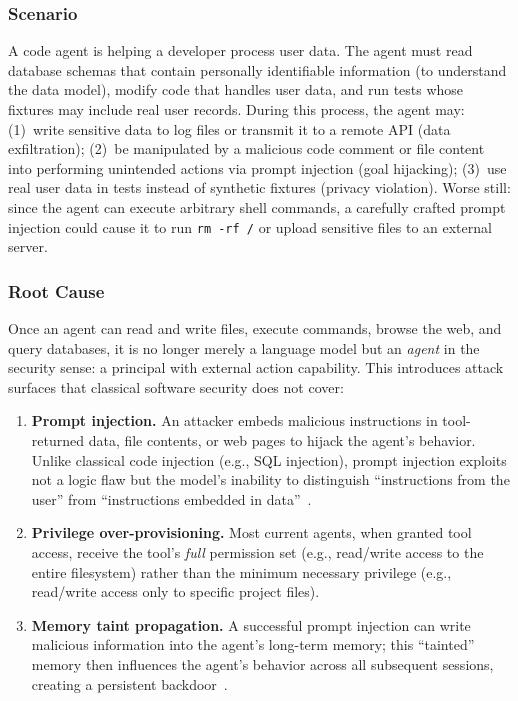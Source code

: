 \subsubsection{Scenario}
A code agent is helping a developer process user data.
The agent must read database schemas that contain personally identifiable information (to understand the data model), modify code that handles user data, and run tests whose fixtures may include real user records.
During this process, the agent may: (1)~write sensitive data to log files or transmit it to a remote API (data exfiltration); (2)~be manipulated by a malicious code comment or file content into performing unintended actions via prompt injection (goal hijacking); (3)~use real user data in tests instead of synthetic fixtures (privacy violation).
Worse still: since the agent can execute arbitrary shell commands, a carefully crafted prompt injection could cause it to run \texttt{rm -rf /} or upload sensitive files to an external server.

\subsubsection{Root Cause}
Once an agent can read and write files, execute commands, browse the web, and query databases, it is no longer merely a language model but an \emph{agent} in the security sense: a principal with external action capability.
This introduces attack surfaces that classical software security does not cover:

\begin{enumerate}[nosep]
\item \textbf{Prompt injection.}
An attacker embeds malicious instructions in tool-returned data, file contents, or web pages to hijack the agent's behavior.
Unlike classical code injection (e.g., SQL injection), prompt injection exploits not a logic flaw but the model's inability to distinguish ``instructions from the user'' from ``instructions embedded in data''~\cite{debenedetti2025camel,owasp_agentic2026}.

\item \textbf{Privilege over-provisioning.}
Most current agents, when granted tool access, receive the tool's \emph{full} permission set (e.g., read/write access to the entire filesystem) rather than the minimum necessary privilege (e.g., read/write access only to specific project files).

\item \textbf{Memory taint propagation.}
A successful prompt injection can write malicious information into the agent's long-term memory; this ``tainted'' memory then influences the agent's behavior across all subsequent sessions, creating a persistent backdoor~\cite{aura2025}.
\end{enumerate}

